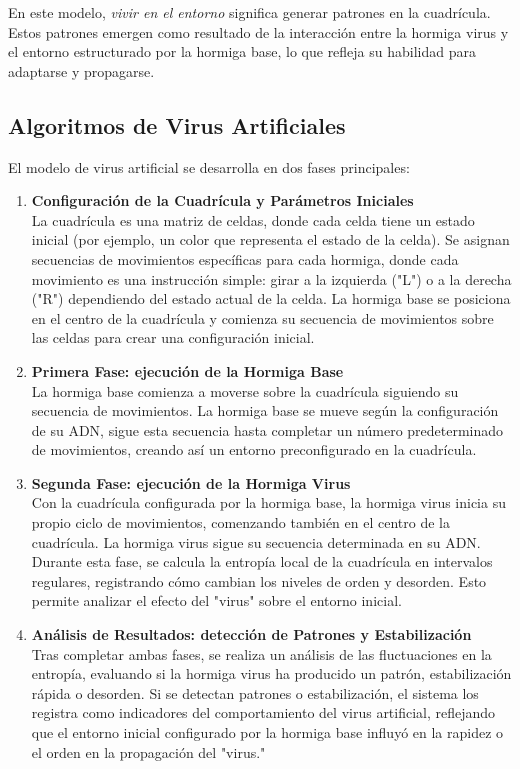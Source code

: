\documentclass[twocolumn]{article}
\begin{document}
En este modelo, \textit{vivir en el entorno} significa generar patrones en la cuadrícula. Estos patrones emergen como resultado de la interacción entre la hormiga virus y el entorno estructurado por la hormiga base, lo que refleja su habilidad para adaptarse y propagarse.

\subsection{Algoritmos de Virus Artificiales}
El modelo de virus artificial se desarrolla en dos fases principales:

\begin{enumerate}
    \item \textbf{Configuración de la Cuadrícula y Parámetros Iniciales} \\
    La cuadrícula es una matriz de celdas, donde cada celda tiene un estado inicial (por ejemplo, un color que representa el estado de la celda). Se asignan secuencias de movimientos específicas para cada hormiga, donde cada movimiento es una instrucción simple: girar a la izquierda ("L") o a la derecha ("R") dependiendo del estado actual de la celda. La hormiga base se posiciona en el centro de la cuadrícula y comienza su secuencia de movimientos sobre las celdas para crear una configuración inicial.

    \item \textbf{Primera Fase: ejecución de la Hormiga Base} \\
    La hormiga base comienza a moverse sobre la cuadrícula siguiendo su secuencia de movimientos. La hormiga base se mueve según la configuración de su ADN, sigue esta secuencia hasta completar un número predeterminado de movimientos, creando así un entorno preconfigurado en la cuadrícula.

    \item \textbf{Segunda Fase: ejecución de la Hormiga Virus} \\
    Con la cuadrícula configurada por la hormiga base, la hormiga virus inicia su propio ciclo de movimientos, comenzando también en el centro de la cuadrícula. La hormiga virus sigue su secuencia determinada en su ADN. Durante esta fase, se calcula la entropía local de la cuadrícula en intervalos regulares, registrando cómo cambian los niveles de orden y desorden. Esto permite analizar el efecto del "virus" sobre el entorno inicial.

    \item \textbf{Análisis de Resultados: detección de Patrones y Estabilización} \\
    Tras completar ambas fases, se realiza un análisis de las fluctuaciones en la entropía, evaluando si la hormiga virus ha producido un patrón, estabilización rápida o desorden. Si se detectan patrones o estabilización, el sistema los registra como indicadores del comportamiento del virus artificial, reflejando que el entorno inicial configurado por la hormiga base influyó en la rapidez o el orden en la propagación del "virus."
\end{enumerate}
\end{document}
